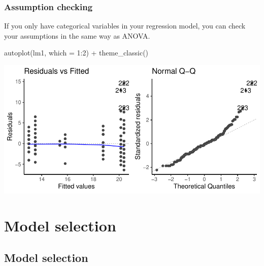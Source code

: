 \documentclass[a4paper]{article}
\begin{document}
\subsubsection{Assumption checking}
If you only have categorical variables in your regression model, you can check your assumptions in the same way as ANOVA.
\begin{Schunk}
\begin{Sinput}
autoplot(lm1, which = 1:2) + theme_classic()
\end{Sinput}


{\centering \includegraphics[width=\maxwidth]{figure/listings-unnamed-chunk-385-1} 

}

\end{Schunk}
\section{Model selection}\label{sec:29}
\subsection{Model selection}
\end{document}
